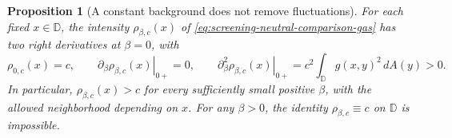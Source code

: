 \documentclass[11pt,a4paper]{article}
\numberwithin{equation}{section}
\newtheorem{proposition}[theorem]{Proposition}
\theoremstyle{definition}
\theoremstyle{remark}
\newcommand{\D}{\mathbb D}
\begin{document}
\begin{proposition}[A constant background does not remove fluctuations]
\label{prop:screening-neutral-comparison-response}
For each fixed $x\in\D$, the intensity $\rho_{\beta,c}(x)$ of
\eqref{eq:screening-neutral-comparison-gas} has two right derivatives
at $\beta=0$, with
\begin{equation}
 \rho_{0,c}(x)=c,\qquad
 \left.\partial_\beta\rho_{\beta,c}(x)\right|_{0+}=0,\qquad
 \left.\partial_\beta^2\rho_{\beta,c}(x)\right|_{0+}
       =c^2\int_\D g(x,y)^2\,dA(y)>0.
 \label{eq:screening-neutral-comparison-second-response}
\end{equation}
In particular, $\rho_{\beta,c}(x)>c$ for every sufficiently small
positive $\beta$, with the allowed neighborhood depending on $x$.
For any $\beta>0$, the identity $\rho_{\beta,c}\equiv c$ on $\D$ is
impossible.
\end{proposition}
\end{document}
